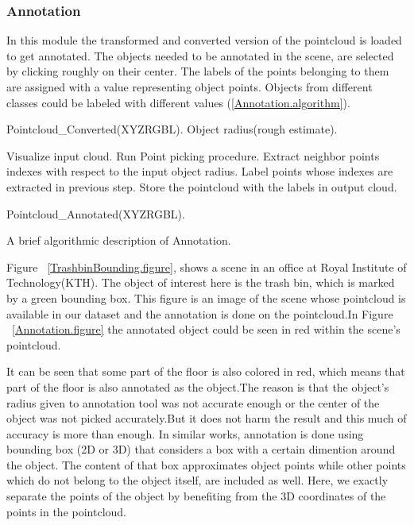  
 
\subsubsection{Annotation}
\label{Annotation.ssec}
In this module the transformed and converted version of the pointcloud is loaded to get annotated. 
The objects needed to be annotated in the scene, are selected by clicking roughly on their center. 
The labels of the points belonging to them are assigned with a value representing object points. 
Objects from different classes could be labeled with different values (\ref{Annotation.algorithm}).

\begin{algorithm}[t]
\begin{algorithmic}[1]
\REQUIRE Pointcloud\_Converted(XYZRGBL).
\REQUIRE Object radius(rough estimate).
\medskip

\STATE Visualize input cloud.
  \STATE Run Point picking procedure.
  \STATE Extract neighbor points indexes with respect to the input object radius.
  \STATE Label points whose indexes are extracted in previous step.
\ENDFOR
\STATE Store the pointcloud with the labels in output cloud.

\medskip
\ENSURE Pointcloud\_Annotated(XYZRGBL).
\end{algorithmic}
\caption[Annotation.]
{A brief algorithmic description of Annotation.}
\label{Annotation.algorithm}
\end{algorithm}


Figure ~\ref{TrashbinBounding.figure}, shows a scene in an office at Royal Institute of Technology(KTH). 
The object of interest here is the trash bin, which is marked by a green bounding box. 
This figure is an image of the scene whose pointcloud is available in our dataset and the annotation is done on 
the pointcloud.In Figure ~\ref{Annotation.figure} the annotated object could be seen in red within the scene's pointcloud.


It can be seen that some part of the floor is also colored in red, which means that part of the floor is also 
annotated as the object.The reason is that the object's radius given to annotation tool was not accurate enough or the center of the 
object was not picked accurately.But it does not harm the result and this much of accuracy is more than enough.
In similar works, annotation is done using bounding box (2D or 3D) that considers a box with a certain dimention around the object. The content of that box approximates object points while other points which do not belong to the object itself, are included as well.
Here, we exactly separate the points of the object by benefiting from the 3D coordinates of the points in the 
pointcloud.



